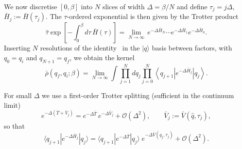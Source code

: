 We now discretise $[0,\beta]$ into $N$ slices of width $\Delta=\beta/N$ and define
$\tau_j=j\Delta$, $\bar H_j:=\bar H(\tau_j)$. The $\tau$-ordered exponential is then
given by the Trotter product~\cite{kleinertPathIntegralsQuantum2009,schulmanTechniquesApplicationsPath1981}
\begin{equation}
    \hat\tau \exp\!\left[-\int_{0}^{\beta} d\tau\,\bar H(\tau)\right]
    =\lim_{N\to\infty}\, e^{-\Delta \bar H_{N}}\cdots e^{-\Delta \bar H_{1}}e^{-\Delta \bar H_{0}}.
    \label{eq:quenched_timeslice}
\end{equation}
Inserting $N$ resolutions of the identity~\cite{kleinertPathIntegralsQuantum2009} in the $|q\rangle$ basis between factors, with
$q_0=q_i$ and $q_{N+1}=q_f$, we obtain the kernel
\begin{equation}
    \bar\rho(q_f,q_i;\beta)
    =
    \lim_{N\to\infty}
    \int \prod_{j=1}^{N} dq_j
    \prod_{j=0}^{N}
    \left\langle q_{j+1}\right| e^{-\Delta \bar H_j}\left|q_j\right\rangle.
    \label{eq:quenched_kernel_product}
\end{equation}

For small $\Delta$ we use a first-order Trotter splitting (sufficient in the continuum
limit)~\cite{kleinertPathIntegralsQuantum2009}
\begin{equation}
    e^{-\Delta(\bar T+\bar V_j)}
    =
    e^{-\Delta \bar T}\,e^{-\Delta \bar V_j}
    +\mathcal O(\Delta^2),
    \qquad
    \bar V_j:=\bar V(\hat q,\tau_j),
    \label{eq:trotter_split}
\end{equation}
so that
\begin{equation}
    \langle q_{j+1}|e^{-\Delta \bar H_j}|q_j\rangle
    =
    \langle q_{j+1}|e^{-\Delta \bar T}|q_j\rangle\;
    e^{-\Delta \bar V(q_j,\tau_j)}
    +\mathcal O(\Delta^2).
    \label{eq:short_time_kernel_split}
\end{equation}

